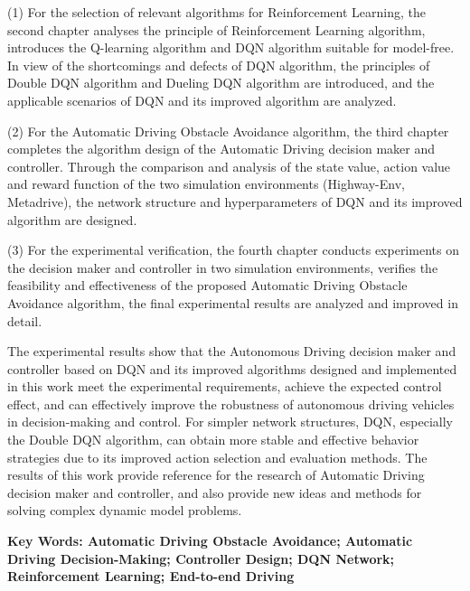(1) For the selection of relevant algorithms for Reinforcement Learning, the second chapter analyses the principle of Reinforcement Learning algorithm, introduces the Q-learning algorithm and DQN algorithm suitable for model-free. In view of the shortcomings and defects of DQN algorithm, the principles of Double DQN algorithm and Dueling DQN algorithm are introduced, and the applicable scenarios of DQN and its improved algorithm are analyzed.

(2) For the Automatic Driving Obstacle Avoidance algorithm, the third chapter completes the algorithm design of the Automatic Driving decision maker and controller. Through the comparison and analysis of the state value, action value and reward function of the two simulation environments (Highway-Env, Metadrive), the network structure and hyperparameters of DQN and its improved algorithm are designed. 

(3) For the experimental verification, the fourth chapter conducts experiments on the decision maker and controller in two simulation environments, verifies the feasibility and effectiveness of the proposed Automatic Driving Obstacle Avoidance algorithm, the final experimental results are analyzed and improved in detail.

The experimental results show that the Autonomous Driving decision maker and controller based on DQN and its improved algorithms designed and implemented in this work meet the experimental requirements, achieve the expected control effect, and can effectively improve the robustness of autonomous driving vehicles in decision-making and control. For simpler network structures, DQN, especially the Double DQN algorithm, can obtain more stable and effective behavior strategies due to its improved action selection and evaluation methods. The results of this work provide reference for the research of Automatic Driving decision maker and controller, and also provide new ideas and methods for solving complex dynamic model problems.

\vspace{3ex}\noindent\textbf{Key Words: Automatic Driving Obstacle Avoidance; Automatic Driving Decision-Making; Controller Design; DQN Network; Reinforcement Learning; End-to-end Driving}
\newpage
